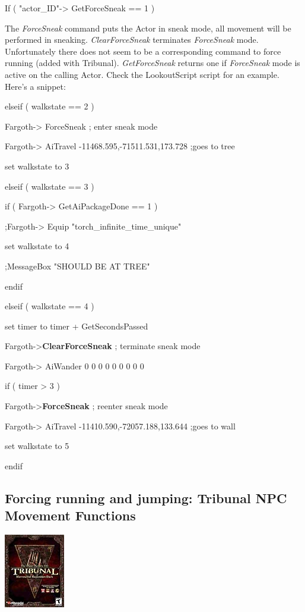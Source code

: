 If ( "actor\_ID"-> GetForceSneak == 1 )

The \emph{ForceSneak} command puts the Actor in sneak mode, all movement
will be performed in sneaking. \emph{ClearForceSneak} terminates
\emph{ForceSneak} mode. Unfortunately there does not seem to be a
corresponding command to force running (added with Tribunal).
\emph{GetForceSneak} returns one if \emph{ForceSneak} mode is active on
the calling Actor. Check the LookoutScript script for an example. Here's
a snippet:

elseif ( walkstate == 2 )

Fargoth-> ForceSneak ; enter sneak mode

Fargoth-> AiTravel -11468.595,-71511.531,173.728 ;goes to
tree

set walkstate to 3

elseif ( walkstate == 3 )

if ( Fargoth-> GetAiPackageDone == 1 )

;Fargoth-> Equip "torch\_infinite\_time\_unique"

set walkstate to 4

;MessageBox "SHOULD BE AT TREE"

endif

elseif ( walkstate == 4 )

set timer to timer + GetSecondsPassed

Fargoth->\textbf{ClearForceSneak} ; terminate sneak mode

Fargoth-> AiWander 0 0 0 0 0 0 0 0 0

if ( timer > 3 )

Fargoth->\textbf{ForceSneak} ; reenter sneak mode

Fargoth-> AiTravel -11410.590,-72057.188,133.644 ;goes to
wall

set walkstate to 5

endif

\hypertarget{forcing-running-and-jumping-tribunal-npc-movement-functions}{%
\subsection{\texorpdfstring{\hfill\break
Forcing running and jumping: Tribunal NPC Movement
Functions}{ Forcing running and jumping: Tribunal NPC Movement Functions}}\label{forcing-running-and-jumping-tribunal-npc-movement-functions}}

\includegraphics{media/image6.png}

